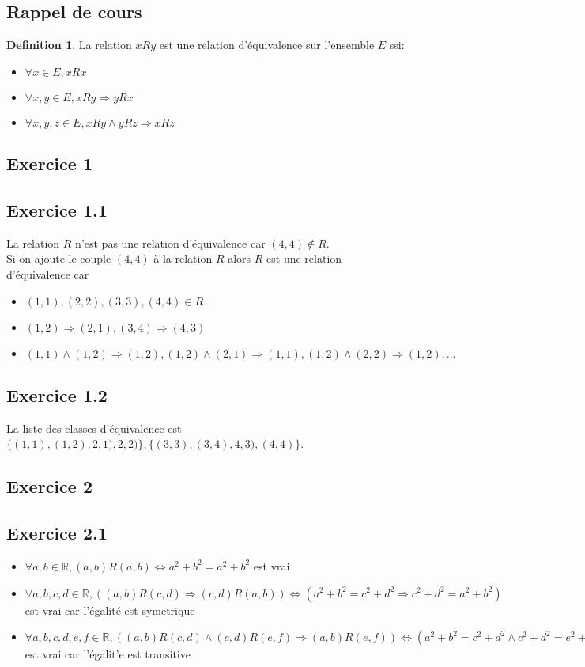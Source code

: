 \documentclass[]{book}
\theoremstyle{definition}
\newtheorem{defn}{Definition}
\newcommand{\bb}[1]{\mathbb{#1}}
\newcommand{\R}{\bb{R}}
\begin{document}
\subsection*{Rappel de cours}

\begin{defn}
La relation $xRy$ est une relation d'\'equivalence sur l'ensemble $E$ ssi:
\begin{itemize}
\item $\forall x \in E, xRx$
\item $\forall x,y \in E, xRy \Rightarrow yRx$
\item $\forall x,y,z \in E, xRy \wedge yRz \Rightarrow xRz$
\end{itemize}
\end{defn}


\newpage
\subsection*{Exercice 1}
\subsection*{Exercice 1.1}
La relation $R$ n'est pas une relation d'\'equivalence car $(4,4) \not\in R$.\\
Si on ajoute le couple $(4,4)$ \`a la relation $R$ alors $R$ est une relation d'\'equivalence car 
\begin{itemize}
\item $(1,1),(2,2),(3,3),(4,4) \in R$
\item $(1,2) \Rightarrow (2,1), (3,4) \Rightarrow (4,3)$
\item $(1,1) \wedge (1,2) \Rightarrow (1,2), (1,2) \wedge (2,1) \Rightarrow (1,1), (1,2) \wedge (2,2) \Rightarrow (1,2),\ldots $
\end{itemize}

\subsection*{Exercice 1.2}
La liste des classes d'\'equivalence est $\{(1,1),(1,2),2,1),2,2)\}, \{(3,3),(3,4),4,3),(4,4)\}$.


\subsection*{Exercice 2}
\subsection*{Exercice 2.1}
\begin{itemize}
\item $\forall a,b \in \R, (a,b)R(a,b) \Leftrightarrow a^2+b^2 = a^2 + b^2$ est vrai
\item $\forall a,b,c,d \in \R, ((a,b)R(c,d) \Rightarrow (c,d)R(a,b)) \Leftrightarrow (a^2+b^2 = c^2 + d^2 \Rightarrow c^2 + d^2 = a^2+b^2)$ est vrai car l'\'egalit\'e est symetrique
\item $\forall a,b,c,d,e,f \in \R, ((a,b)R(c,d) \wedge (c,d)R(e,f) \Rightarrow (a,b)R(e,f)) \Leftrightarrow (a^2+b^2 = c^2 + d^2 \wedge c^2 + d^2 = e^2+f^2\Rightarrow a^2 + b^2 = e^2+f^2)$ est vrai car l'\'egalit'e est transitive
\end{itemize}
\end{document}
